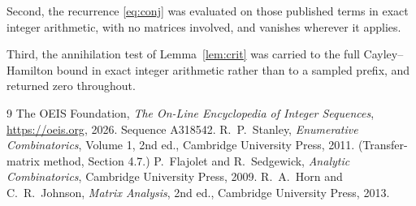 \documentclass[11pt,a4paper]{article}
\theoremstyle{plain}
\theoremstyle{definition}
\begin{document}
Second, the recurrence \eqref{eq:conj} was evaluated on those published terms in exact
integer arithmetic, with no matrices involved, and vanishes wherever it applies.

Third, the annihilation test of Lemma~\ref{lem:crit} was carried to the full
Cayley--Hamilton bound in exact integer arithmetic rather than to a sampled prefix, and
returned zero throughout.

\begin{thebibliography}{9}
 The OEIS Foundation, \emph{The On-Line Encyclopedia of Integer
Sequences}, \url{https://oeis.org}, 2026. Sequence A318542.
 R.~P.~Stanley, \emph{Enumerative Combinatorics}, Volume 1, 2nd ed.,
Cambridge University Press, 2011. (Transfer-matrix method, Section 4.7.)
 P.~Flajolet and R.~Sedgewick, \emph{Analytic Combinatorics}, Cambridge
University Press, 2009.
 R.~A.~Horn and C.~R.~Johnson, \emph{Matrix Analysis}, 2nd ed., Cambridge
University Press, 2013.
\end{thebibliography}
\end{document}
